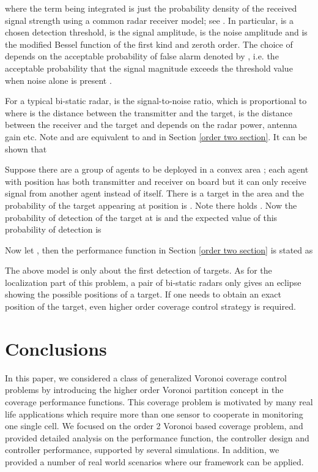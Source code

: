 \documentclass[letterpaper, 10 pt, conference]{ieeeconf}
\begin{document}
where the term being integrated is just the probability density of the received signal strength using a common radar receiver model; see \cite{mahafza2013radar}. In particular,  is a chosen detection threshold,  is the signal amplitude,  is the noise amplitude and  is the modified Bessel function of the first kind and zeroth order.
The choice of  depends on the acceptable probability of false alarm denoted by , i.e. the acceptable probability that the signal magnitude exceeds the threshold value when noise alone is present \cite{mahafza2013radar}.

For a typical bi-static radar,  is the signal-to-noise ratio, which is proportional to  where  is the distance between the transmitter and the target,  is the distance between the receiver and the target and  depends on the radar power, antenna gain etc. Note  and  are equivalent to  and  in Section \ref{order two section}. It can be shown that


Suppose there are a group of agents to be deployed in a convex area ;  each agent with position  has both transmitter and receiver on board but it can only receive signal from another agent instead of itself.
There is a target in the area and the probability of the target appearing at position  is . Note there holds . Now the probability of detection of the target at  is  and the expected value of this probability of detection is

Now let , then the performance function  in Section \ref{order two section} is stated as


The above model is only about the first detection of targets. As for the localization part of this problem, a pair of bi-static radars only gives an eclipse showing the possible positions of a target. If one needs to obtain an exact position of the target, even higher order coverage control strategy is required.

\section{Conclusions}
In this paper, we considered a class of generalized Voronoi coverage control problems by introducing the higher order Voronoi partition concept in the coverage performance functions. This coverage problem is motivated by many real life applications which require more than one sensor to cooperate in monitoring one single cell. We focused on the order 2 Voronoi based coverage problem, and provided detailed analysis on the performance function, the controller design and controller performance, supported by several simulations.  In addition, we provided a number of real world scenarios where our framework can be applied.
\end{document}
